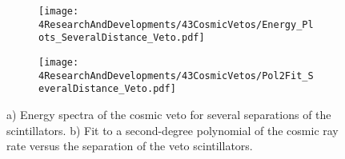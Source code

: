 \begin{figure}
\centering
    \begin{subfigure}[b]{1\textwidth}
    \centering
    \texttt{[image: 4ResearchAndDevelopments/43CosmicVetos/Energy\_Plots\_SeveralDistance\_Veto.pdf]}  
    \caption{\label{subfig:EnergySpectrumsSeveralDistanceVeto}}
    \end{subfigure}
    \hfill
    \begin{subfigure}[b]{1\textwidth}
    \centering
    \texttt{[image: 4ResearchAndDevelopments/43CosmicVetos/Pol2Fit\_SeveralDistance\_Veto.pdf]}  
    \caption{\label{subfig:LinearFitSeveralDistanceVeto}}
    \end{subfigure}
 \caption{a) Energy spectra of the cosmic veto for several separations of the scintillators. b) Fit to a second-degree polynomial of the cosmic ray rate versus the separation of the veto scintillators.}
 \label{fig:DistanceVeto}
\end{figure}

